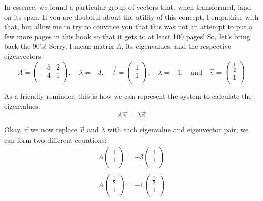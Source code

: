 \documentclass[a4,12pt,twosided,openany]{memoir}
\begin{document}
\par 
\indent
In essence, we found a particular group of vectors that, when transformed, land on its span. If you are doubtful about the utility of this concept, I empathise with that, but allow me to try to convince you that this was not an attempt to put a few more pages in this book so that it gets to at least 100 pages! So, let’s bring back the 90’s! Sorry, I mean matrix $A$, its eigenvalues, and the respective eigenvectors:
\[ A = \begin{pmatrix}
-5 & 2  \\
-4 & 1 \\
\end{pmatrix},\quad \lambda = -3,  \quad  \overrightarrow{t} = \begin{pmatrix}
1  \\
1 \\
\end{pmatrix}, \quad   \lambda = -1, \quad \textrm{and}  \quad \overrightarrow{v}  =  \begin{pmatrix}
\frac{1}{2}  \\
1 \\
\end{pmatrix} \]
\par 
\indent
As a friendly reminder, this is how we can represent the system to calculate the eigenvalues:
\[A\overrightarrow{v} = \lambda \overrightarrow{v} \]
\par 
\indent
Okay, if we now replace $\overrightarrow{v}$ and $\lambda$ with each eigenvalue and eigenvector pair, we can form two different equations:
\begin{equation}\label{eq:eigenSystem}
\begin{split}
A\begin{pmatrix}
1  \\
1 \\
\end{pmatrix} = -3\begin{pmatrix}
1  \\
1 \\
\end{pmatrix}\\
\\
A\begin{pmatrix}
\frac{1}{2}  \\
1 \\
\end{pmatrix} = -1\begin{pmatrix}
\frac{1}{2}  \\
1 \\
\end{pmatrix}
\end{split}  
\end{equation}
\end{document}
